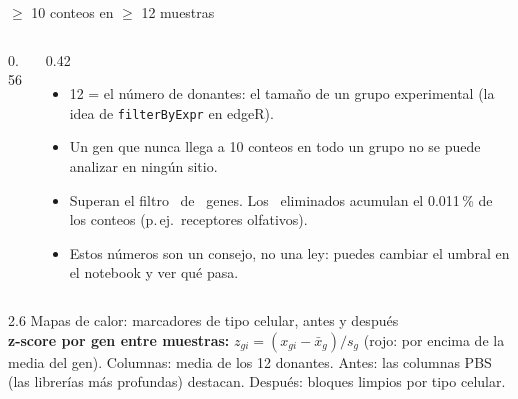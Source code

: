 \begin{frame}{$\geq$ 10 conteos en $\geq$ 12 muestras}
  \begin{columns}[c]
    \begin{column}{0.56\linewidth}
    \end{column}
    \begin{column}{0.42\linewidth}\small
      \begin{itemize}\setlength\itemsep{4pt}
        \item 12 = el número de donantes: el tamaño de un grupo experimental (la idea de \texttt{filterByExpr} en edgeR).
        \item Un gen que nunca llega a 10 conteos en todo un grupo no se puede analizar en ningún sitio.
        \item Superan el filtro \alert{\numngenes\ de \numngenesraw\ genes}. Los \numngenesremoved\ eliminados acumulan el 0.011\,\% de los conteos (p.\,ej.\ receptores olfativos).
        \item Estos números son un consejo, no una ley: puedes cambiar el umbral en el notebook y ver qué pasa.
      \end{itemize}
    \end{column}
  \end{columns}
\end{frame}

\begin{frame}{2.6 Mapas de calor: marcadores de tipo celular, antes y después}
  \centering
  \vspace{-0.15cm}\\
  \scriptsize
  \textbf{z-score por gen entre muestras:} $z_{gi}=(x_{gi}-\bar x_g)/s_g$ (rojo: por encima de la media del gen). Columnas: media de los 12 donantes. \alert{Antes}: las columnas PBS (las librerías más profundas) destacan. \alert{Después}: bloques limpios por tipo celular.
\end{frame}

